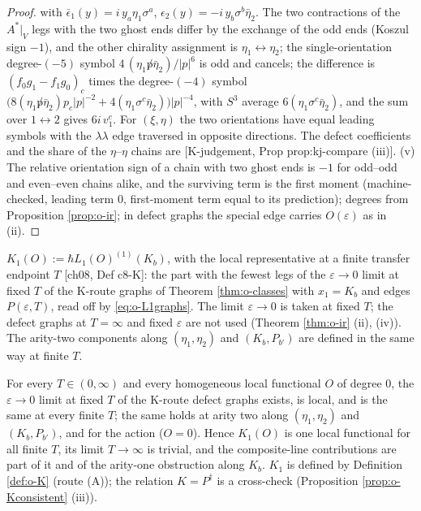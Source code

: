 \begin{proof}
with $\bar\epsilon_1(y)=i\,y_a\eta_1\sigma^a$, $\epsilon_2(y)=-i\,y_b\sigma^b\bar\eta_2$. The two contractions of the $A^*|_V$ legs with the two ghost ends differ by the exchange of the odd ends (Koszul sign $-1$), and the other chirality assignment is $\eta_1\leftrightarrow\eta_2$; the single-orientation degree-$(-5)$ symbol $4\,(\eta_1{\not p}\bar\eta_2)/|p|^6$ is odd and cancels; the difference is $(f_0g_1-f_1g_0)_c$ times the degree-$(-4)$ symbol $\big(8(\eta_1{\not p}\bar\eta_2)p_c|p|^{-2}+4(\eta_1\sigma^c\bar\eta_2)\big)|p|^{-4}$, with $S^3$ average $6(\eta_1\sigma^c\bar\eta_2)$, and the sum over $1\leftrightarrow2$ gives $6i\,v_1^c$. For $(\xi,\eta)$ the two orientations have equal leading symbols with the $\lambda\lambda$ edge traversed in opposite directions. The defect coefficients and the share of the $\eta$--$\eta$ chains are [K-judgement, Prop prop:kj-compare (iii)]. (v) The relative orientation sign of a chain with two ghost ends is $-1$ for odd--odd and even--even chains alike, and the surviving term is the first moment (machine-checked, leading term $0$, first-moment term equal to its prediction); degrees from Proposition \ref{prop:o-ir}; in defect graphs the special edge carries $O(\varepsilon)$ as in (ii).
\end{proof}

\begin{definition}
\label{def:o-K}
$K_1(O):=\hbar L_1(O)^{(1)}(K_b)$, with the local representative at a finite transfer endpoint $T$ [ch08, Def c8-K]: the part with the fewest legs of the $\varepsilon\to0$ limit at fixed $T$ of the K-route graphs of Theorem \ref{thm:o-classes} with $x_1=K_b$ and edges $P(\varepsilon,T)$, read off by \eqref{eq:o-L1graphs}. The limit $\varepsilon\to0$ is taken at fixed $T$; the defect graphs at $T=\infty$ and fixed $\varepsilon$ are not used (Theorem \ref{thm:o-ir} (ii), (iv)). The arity-two components along $(\eta_1,\eta_2)$ and $(K_b,P_{b'})$ are defined in the same way at finite $T$.
\end{definition}

\begin{proposition}
\label{prop:o-Kclaim}
For every $T\in(0,\infty)$ and every homogeneous local functional $O$ of degree $0$, the $\varepsilon\to0$ limit at fixed $T$ of the K-route defect graphs exists, is local, and is the same at every finite $T$; the same holds at arity two along $(\eta_1,\eta_2)$ and $(K_b,P_{b'})$, and for the action ($O=0$). Hence $K_1(O)$ is one local functional for all finite $T$, its limit $T\to\infty$ is trivial, and the composite-line contributions are part of it and of the arity-one obstruction along $K_b$. $K_1$ is defined by Definition \ref{def:o-K} (route (A)); the relation $K=P^\dagger$ is a cross-check (Proposition \ref{prop:o-Kconsistent} (iii)).
\end{proposition}

